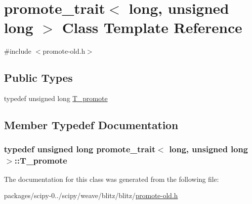 \hypertarget{classpromote__trait_3_01long_00_01unsigned_01long_01_4}{}\section{promote\+\_\+trait$<$ long, unsigned long $>$ Class Template Reference}
\label{classpromote__trait_3_01long_00_01unsigned_01long_01_4}


{\ttfamily \#include $<$promote-\/old.\+h$>$}

\subsection*{Public Types}
\begin{DoxyCompactItemize}
\item 
typedef unsigned long \hyperlink{classpromote__trait_3_01long_00_01unsigned_01long_01_4_afc65e245b216c7267a2822264aa23e3b}{T\+\_\+promote}
\end{DoxyCompactItemize}


\subsection{Member Typedef Documentation}
\hypertarget{classpromote__trait_3_01long_00_01unsigned_01long_01_4_afc65e245b216c7267a2822264aa23e3b}{}
\subsubsection[{T\+\_\+promote}]{\setlength{\rightskip}{0pt plus 5cm}typedef unsigned long {\bf promote\+\_\+trait}$<$ long, unsigned long $>$\+::{\bf T\+\_\+promote}}\label{classpromote__trait_3_01long_00_01unsigned_01long_01_4_afc65e245b216c7267a2822264aa23e3b}


The documentation for this class was generated from the following file\+:\begin{DoxyCompactItemize}
\item 
packages/scipy-\/0../scipy/weave/blitz/blitz/\hyperlink{promote-old_8h}{promote-\/old.\+h}\end{DoxyCompactItemize}
